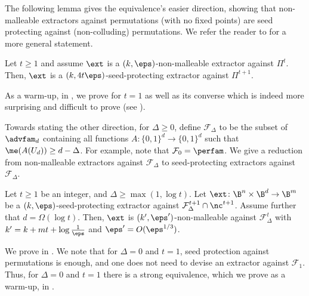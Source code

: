 The following lemma gives the equivalence's easier direction, showing that non-malleable extractors against permutations (with no fixed points) are seed protecting against (non-colluding) permutations. We refer the reader to  for a more general statement.

\begin{lemma}\label{lem:intro nm is sp}
	Let $t \ge 1$ and assume $\ext$ is a $(k,\eps)$-non-malleable extractor
	against $\Pi^t$. Then, $\ext$ is a $(k,4t\eps)$-seed-protecting extractor against $\Pi^{t+1}$.
\end{lemma}

As a %
warm-up,  %
in , we prove  for $t=1$ as well as its converse which is indeed more surprising and difficult to prove (see ). 

Towards stating the other direction, 
for $\Delta \ge 0$, define $\mathcal{F}_{\Delta}$ to be the subset of $\advfam_d$ containing all functions $A \colon \{0,1\}^d \to \{0,1\}^d$ such that 
$\me(A(U_d)) \ge d-\Delta$. %
%
%
For example, note that $\mathcal{F}_0 = \perfam$. We
give a reduction from non-malleable extractors against $\mathcal{F}_\Delta$ to seed-protecting extractors against $\mathcal{F}_\Delta$. 

\begin{theorem}\label{thm:last one}
	Let $t \ge 1$ be an integer, and $\Delta \ge \max(1,\log{t})$.
	Let $\ext\colon\B^{n}\times\B^{d}\rightarrow\B^m$ be a $(k,\eps)$-seed-protecting extractor against $\mathcal{F}^{t+1}_{\Delta} \cap \nc^{t+1}$. Assume further that $d = \Omega(\log{t})$. Then, $\ext$ is $(k',\eps')$-non-malleable against $\mathcal{F}_{\Delta}^t$ with $k' = k+mt+\log\frac1{\eps}$ and $\eps' = O(\eps^{1/3})$.
\end{theorem}

We prove  in . 
We note that for $\Delta = 0$ and $t = 1$, seed protection against
permutations is enough, and one does not need to devise an extractor against $\mathcal{F}_1$.
Thus, for $\Delta = 0$ and $t = 1$ there is a strong equivalence, which we prove 
as a warm-up, in .


%

%



%

